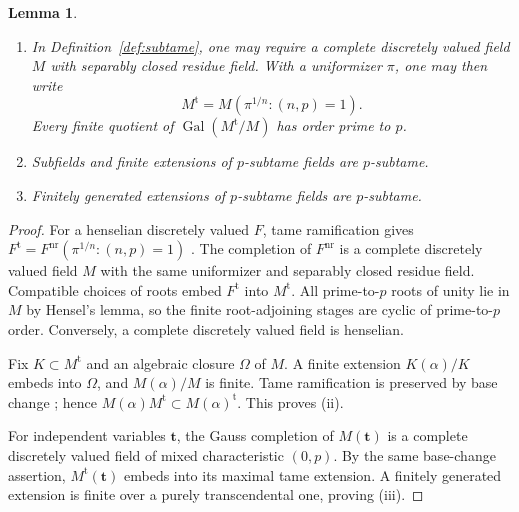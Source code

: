 \documentclass[11pt,a4paper]{article}
\numberwithin{equation}{section}
\theoremstyle{plain}
\newtheorem{lemma}[theorem]{Lemma}
\theoremstyle{definition}
\theoremstyle{remark}
\newcommand{\nr}{\mathrm{nr}}
\newcommand{\tame}{\mathrm{t}}
\DeclareMathOperator{\Gal}{Gal}
\newcommand{\stacks}[1]{\href{https://stacks.math.columbia.edu/tag/#1}{\texttt{#1}}}
\begin{document}
\begin{lemma}
\label{lem:fields}
\begin{enumerate}
\item In Definition~\ref{def:subtame}, one may require a complete discretely
valued field $M$ with separably closed residue field. With a uniformizer $\pi$,
one may then write
\[
 M^{\tame}=M(\pi^{1/n}:(n,p)=1).
\]
Every finite quotient of $\Gal(M^{\tame}/M)$ has order prime to $p$.
\item Subfields and finite extensions of $p$-subtame fields are $p$-subtame.
\item Finitely generated extensions of $p$-subtame fields are $p$-subtame.
\end{enumerate}
\end{lemma}
\begin{proof}
For a henselian discretely valued $F$, tame ramification gives
$F^{\tame}=F^{\nr}(\pi^{1/n}:(n,p)=1)$
\cite[Tags~\stacks{04GK}, \stacks{0EXW}]{Stacks}. The completion of
$F^{\nr}$ is a complete discretely valued field $M$ with the same uniformizer
and separably closed residue field. Compatible choices of roots embed
$F^{\tame}$ into $M^{\tame}$. All prime-to-$p$ roots of unity lie in $M$ by
Hensel's lemma, so the finite root-adjoining stages are cyclic of
prime-to-$p$ order. Conversely, a complete discretely valued field is
henselian.

Fix $K\subset M^{\tame}$ and an algebraic closure $\Omega$ of $M$. A finite
extension $K(\alpha)/K$ embeds into $\Omega$, and $M(\alpha)/M$ is finite.
Tame ramification is preserved by base change
\cite[Tag~\stacks{0EXY}]{Stacks}; hence
$M(\alpha)M^{\tame}\subset M(\alpha)^{\tame}$.
This proves (ii).

For independent variables $\mathbf t$, the Gauss completion of
$M(\mathbf t)$ is a complete discretely valued field of mixed
characteristic $(0,p)$. By the same base-change assertion,
$M^{\tame}(\mathbf t)$ embeds into its maximal tame extension.
A finitely generated extension is finite over a purely transcendental one,
proving (iii).
\end{proof}
\end{document}
